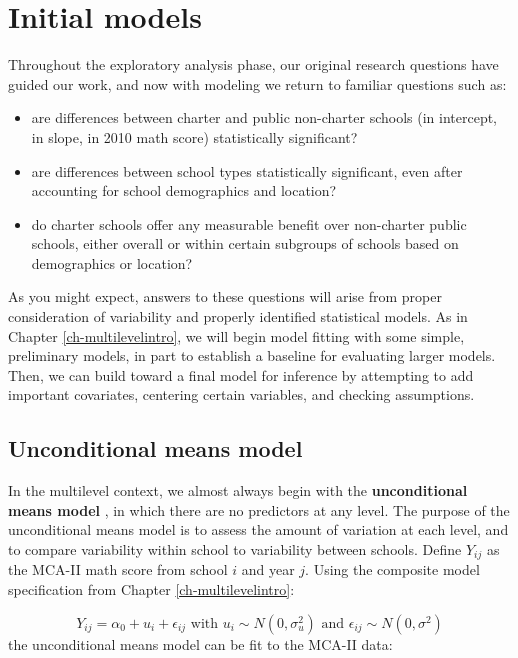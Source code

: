 \documentclass[
]{krantz}
\providecommand{\tightlist}{%
  \setlength{\itemsep}{0pt}\setlength{\parskip}{0pt}}
\begin{document}
\hypertarget{lineartwostageerror}{%
\section{Initial models}\label{lineartwostageerror}}

Throughout the exploratory analysis phase, our original research questions have guided our work, and now with modeling we return to familiar questions such as:

\begin{itemize}
\tightlist
\item
  are differences between charter and public non-charter schools (in intercept, in slope, in 2010 math score) statistically significant?
\item
  are differences between school types statistically significant, even after accounting for school demographics and location?
\item
  do charter schools offer any measurable benefit over non-charter public schools, either overall or within certain subgroups of schools based on demographics or location?
\end{itemize}

As you might expect, answers to these questions will arise from proper consideration of variability and properly identified statistical models.
As in Chapter \ref{ch-multilevelintro}, we will begin model fitting with some simple, preliminary models, in part to establish a baseline for evaluating larger models. Then, we can build toward a final model for inference by attempting to add important covariates, centering certain variables, and checking assumptions.

\hypertarget{modela}{%
\subsection{Unconditional means model}\label{modela}}

In the multilevel context, we almost always begin with the \textbf{unconditional means model} , in which there are no predictors at any level. The purpose of the unconditional means model is to assess the amount of variation at each level, and to compare variability within school to variability between schools. Define \(Y_{ij}\) as the MCA-II math score from school \(i\) and year \(j\). Using the composite model specification from Chapter \ref{ch-multilevelintro}:

\begin{equation*}
Y _{ij} = \alpha_{0} + u_{i} + \epsilon_{ij} \textrm{ with } u_{i} \sim N(0, \sigma^2_u) \textrm{ and } \epsilon_{ij} \sim N(0, \sigma^2)
\end{equation*}
the unconditional means model can be fit to the MCA-II data:
\end{document}
